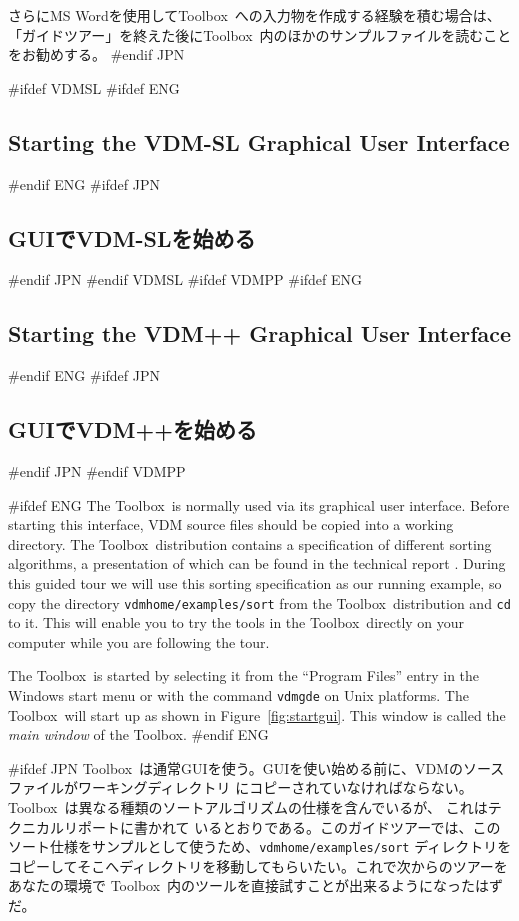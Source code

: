 \documentclass[\pformat,12pt]{article}
\newcommand{\Toolbox}{Toolbox}
\newcommand{\vdmgde}{vdmgde}
\newcommand{\vdmhome}{vdmhome}
\newcommand{\Toolbox}{Toolbox}
\newcommand{\vdmgde}{vppgde}
\newcommand{\vdmhome}{vpphome}
\begin{document}
さらにMS Wordを使用して\Toolbox\ への入力物を作成する経験を積む場合は、
「ガイドツアー」を終えた後に\Toolbox\ 内のほかのサンプルファイルを読むことをお勧めする。
#endif JPN


#ifdef VDMSL
#ifdef ENG
\subsection{Starting the VDM-SL Graphical User Interface} 
#endif ENG
#ifdef JPN
\subsection{GUIでVDM-SLを始める} 
#endif JPN
#endif VDMSL
#ifdef VDMPP
#ifdef ENG
\subsection{Starting the VDM++ Graphical User Interface} 
#endif ENG
#ifdef JPN
\subsection{GUIでVDM++を始める} 
#endif JPN
#endif VDMPP

#ifdef ENG
The \Toolbox\ is normally used via its graphical user interface. Before
starting this interface, VDM source files should be copied into a
working directory. The \Toolbox\ distribution contains a specification
of different sorting algorithms, a presentation of which can be found
in the technical report
.  During
this guided tour we will use this sorting specification as our running
example, so copy the directory {\tt \vdmhome/examples/sort} from the
\Toolbox\ distribution and {\tt cd} to it.  This will enable you to
try the tools in the \Toolbox\ directly on your computer while you are
following the tour.

The \Toolbox\ is started by selecting it from the ``Program Files''
entry in the Windows start menu or with the command {\tt \vdmgde}
 on Unix platforms. The \Toolbox\ 
will start up as shown in Figure~\ref{fig:startgui}. This window is
called the {\em main window\/} of the \Toolbox.
#endif ENG

#ifdef JPN
\Toolbox\ は通常GUIを使う。GUIを使い始める前に、VDMのソースファイルがワーキングディレクトリ
にコピーされていなければならない。\Toolbox\ は異なる種類のソートアルゴリズムの仕様を含んでいるが、
これはテクニカルリポートに書かれて
いるとおりである。このガイドツアーでは、このソート仕様をサンプルとして使うため、{\tt \vdmhome/examples/sort}
ディレクトリをコピーしてそこへディレクトリを移動してもらいたい。これで次からのツアーをあなたの環境で
\Toolbox\ 内のツールを直接試すことが出来るようになったはずだ。
\end{document}
